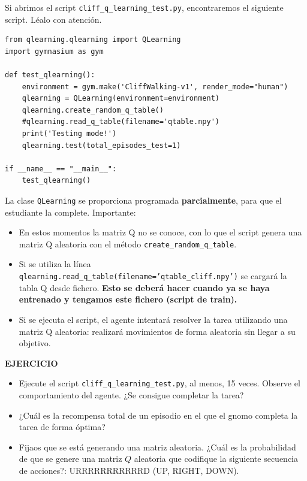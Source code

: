 \documentclass{article}
\begin{document}
\begin{exercise}
Si abrimos el script \texttt{cliff\_q\_learning\_test.py}, encontraremos el siguiente script. Léalo con atención. 

\begin{verbatim}
from qlearning.qlearning import QLearning
import gymnasium as gym

def test_qlearning():
    environment = gym.make('CliffWalking-v1', render_mode="human")
    qlearning = QLearning(environment=environment)
    qlearning.create_random_q_table() 
    #qlearning.read_q_table(filename='qtable.npy')
    print('Testing mode!')
    qlearning.test(total_episodes_test=1)

if __name__ == "__main__":
    test_qlearning()
\end{verbatim}



La clase \texttt{QLearning} se proporciona programada \textbf{parcialmente}, para que el estudiante la complete. Importante:
\begin{itemize}
    \item En estos momentos la matriz Q no se conoce, con lo que el script genera una matriz Q aleatoria con el método \texttt{create\_random\_q\_table}.
    \item Si se utiliza la línea \texttt{qlearning.read\_q\_table(filename='qtable\_cliff.npy')} se cargará la tabla Q desde fichero. \textbf{Esto se deberá hacer cuando ya se haya entrenado y tengamos este fichero (script de train).}
    \item Si se ejecuta el script, el agente intentará resolver la tarea utilizando una matriz Q aleatoria: realizará movimientos de forma aleatoria sin llegar a su objetivo.
\end{itemize}

\textbf{EJERCICIO}\\
\begin{itemize}
    \item Ejecute el script \texttt{cliff\_q\_learning\_test.py}, al menos, 15 veces. Observe el comportamiento del agente. ¿Se consigue completar la tarea?    
    \item  ¿Cuál es la recompensa total de un episodio en el que el gnomo completa la tarea de forma óptima?
    \item  Fijaos que se está generando una matriz aleatoria. ¿Cuál es la probabilidad de que se genere una matriz $Q$ aleatoria que codifique la siguiente secuencia de acciones?: URRRRRRRRRRRD (UP, RIGHT, DOWN).
\end{itemize}

\end{exercise}
\end{document}
